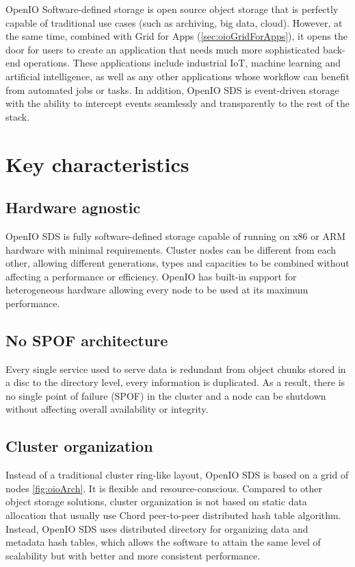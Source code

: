     OpenIO Software-defined storage is open source object storage that is perfectly capable of traditional use cases (such as archiving, big data, cloud). However, at the same time, combined with Grid for Apps (\ref{sec:oioGridForApps}), it opens the door for users to create an application that needs much more sophisticated back-end operations. These applications include industrial IoT, machine learning and artificial intelligence, as well as any other applications whose workflow can benefit from automated jobs or tasks\cite{oioNextGen}. In addition, OpenIO SDS is event-driven storage with the ability to intercept events seamlessly and transparently to the rest of the stack.

    \section{Key characteristics}
    \subsection*{Hardware agnostic}
    OpenIO SDS is fully software-defined storage capable of running on x86 or ARM hardware with minimal requirements. Cluster nodes can be different from each other, allowing different generations, types and capacities to be combined without affecting a performance or efficiency\cite{oioKeyChars}.
    OpenIO has built-in support for heterogeneous hardware allowing every node to be used at its maximum performance.
    \subsection*{No SPOF architecture}
    Every single service used to serve data is redundant from object chunks stored in a disc to the directory level, every information is duplicated. As a result, there is no single point of failure (SPOF) in the cluster and a node can be shutdown without affecting overall availability or integrity\cite{oioCoreSolution}.
    \subsection*{Cluster organization}
    Instead of a traditional cluster ring-like layout, OpenIO SDS is based on a grid of nodes \ref{fig:oioArch}. It is flexible and resource-conscious. Compared to other object storage solutions, cluster organization is not based on static data allocation that usually use Chord peer-to-peer distributed hash table algorithm. Instead, OpenIO SDS uses distributed directory for organizing data and metadata hash tables, which allows the software to attain the same level of scalability but with better and more consistent performance\cite{oioKeyChars}.

